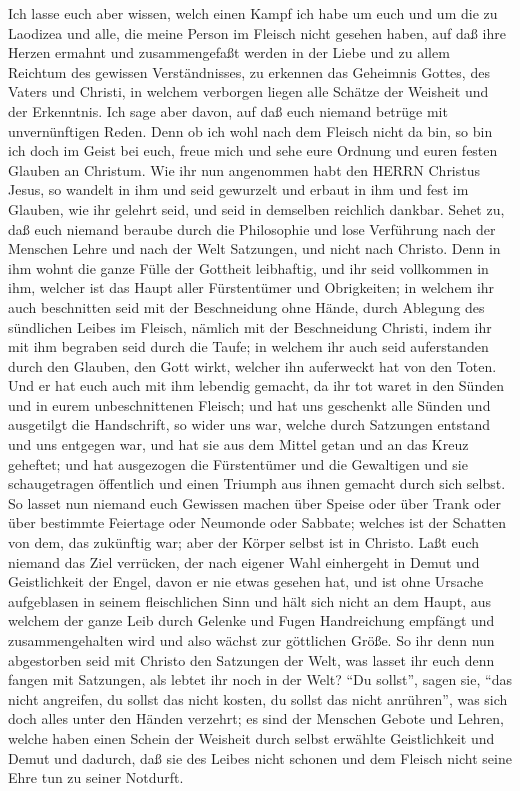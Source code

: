  Ich lasse euch aber wissen, welch einen Kampf ich habe um
euch und um die zu Laodizea und alle, die meine Person im Fleisch nicht
gesehen haben,  auf daß ihre Herzen ermahnt und
zusammengefaßt werden in der Liebe und zu allem Reichtum des gewissen
Verständnisses, zu erkennen das Geheimnis Gottes, des Vaters und
Christi,  in welchem verborgen liegen alle Schätze der
Weisheit und der Erkenntnis.  Ich sage aber davon, auf daß
euch niemand betrüge mit unvernünftigen Reden.  Denn ob ich
wohl nach dem Fleisch nicht da bin, so bin ich doch im Geist bei euch,
freue mich und sehe eure Ordnung und euren festen Glauben an Christum.
 Wie ihr nun angenommen habt den HERRN Christus Jesus, so
wandelt in ihm  und seid gewurzelt und erbaut in ihm und
fest im Glauben, wie ihr gelehrt seid, und seid in demselben reichlich
dankbar.  Sehet zu, daß euch niemand beraube durch die
Philosophie und lose Verführung nach der Menschen Lehre und nach der
Welt Satzungen, und nicht nach Christo.  Denn in ihm wohnt
die ganze Fülle der Gottheit leibhaftig,  und ihr seid
vollkommen in ihm, welcher ist das Haupt aller Fürstentümer und
Obrigkeiten;  in welchem ihr auch beschnitten seid mit der
Beschneidung ohne Hände, durch Ablegung des sündlichen Leibes im
Fleisch, nämlich mit der Beschneidung Christi,  indem ihr
mit ihm begraben seid durch die Taufe; in welchem ihr auch seid
auferstanden durch den Glauben, den Gott wirkt, welcher ihn auferweckt
hat von den Toten.  Und er hat euch auch mit ihm lebendig
gemacht, da ihr tot waret in den Sünden und in eurem unbeschnittenen
Fleisch; und hat uns geschenkt alle Sünden  und ausgetilgt
die Handschrift, so wider uns war, welche durch Satzungen entstand und
uns entgegen war, und hat sie aus dem Mittel getan und an das Kreuz
geheftet;  und hat ausgezogen die Fürstentümer und die
Gewaltigen und sie schaugetragen öffentlich und einen Triumph aus ihnen
gemacht durch sich selbst.  So lasset nun niemand euch
Gewissen machen über Speise oder über Trank oder über bestimmte
Feiertage oder Neumonde oder Sabbate;  welches ist der
Schatten von dem, das zukünftig war; aber der Körper selbst ist in
Christo.  Laßt euch niemand das Ziel verrücken, der nach
eigener Wahl einhergeht in Demut und Geistlichkeit der Engel, davon er
nie etwas gesehen hat, und ist ohne Ursache aufgeblasen in seinem
fleischlichen Sinn  und hält sich nicht an dem Haupt, aus
welchem der ganze Leib durch Gelenke und Fugen Handreichung empfängt und
zusammengehalten wird und also wächst zur göttlichen Größe.
 So ihr denn nun abgestorben seid mit Christo den Satzungen
der Welt, was lasset ihr euch denn fangen mit Satzungen, als lebtet ihr
noch in der Welt?  ``Du sollst'', sagen sie, ``das nicht
angreifen, du sollst das nicht kosten, du sollst das nicht anrühren'',
 was sich doch alles unter den Händen verzehrt; es sind der
Menschen Gebote und Lehren,  welche haben einen Schein der
Weisheit durch selbst erwählte Geistlichkeit und Demut und dadurch, daß
sie des Leibes nicht schonen und dem Fleisch nicht seine Ehre tun zu
seiner Notdurft.

